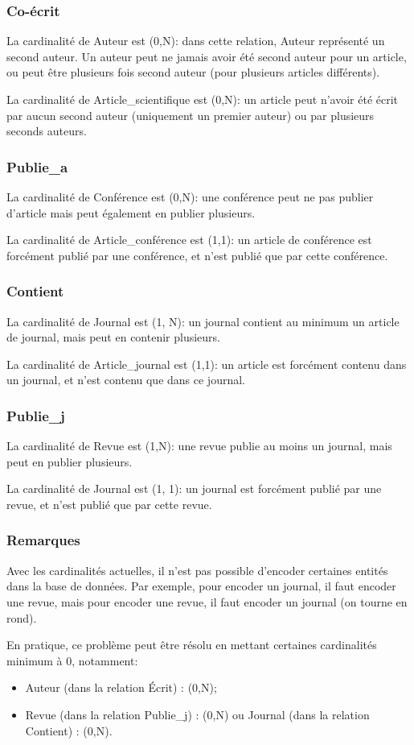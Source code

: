\documentclass[a4paper, 12pt]{article}
\begin{document}
	\subsubsection{Co-écrit}
	La cardinalité de Auteur est (0,N): dans cette relation, Auteur représenté un second auteur. Un auteur peut ne jamais avoir été second auteur pour un article, ou peut être plusieurs fois second auteur (pour plusieurs articles différents).\par
	La cardinalité de Article\_scientifique est (0,N): un article peut n'avoir été écrit par aucun second auteur (uniquement un premier auteur) ou par plusieurs seconds auteurs.
	\subsubsection{Publie\_a}
	La cardinalité de Conférence est (0,N): une conférence peut ne pas publier d'article mais peut également en publier plusieurs.\par
	La cardinalité de Article\_conférence est (1,1): un article de conférence est forcément publié par une conférence, et n'est publié que par cette conférence.
	\subsubsection{Contient}
	La cardinalité de Journal est (1, N): un journal contient au minimum un article de journal, mais peut en contenir plusieurs.\par
	La cardinalité de Article\_journal est (1,1): un article est forcément contenu dans un journal, et n'est contenu que dans ce journal.
	\subsubsection{Publie\_j}
	La cardinalité de Revue est (1,N): une revue publie au moins un journal, mais peut en publier plusieurs.\par
	La cardinalité de Journal est (1, 1): un journal est forcément publié par une revue, et n'est publié que par cette revue.
	\subsubsection{Remarques}
	Avec les cardinalités actuelles, il n'est pas possible d'encoder certaines entités dans la base de données. Par exemple, pour encoder un journal, il faut encoder une revue, mais pour encoder une revue, il faut encoder un journal (on tourne en rond).\par
	En pratique, ce problème peut être résolu en mettant certaines cardinalités minimum à 0, notamment:
	\begin{itemize}
		\item Auteur (dans la relation Écrit) : (0,N);
		\item Revue (dans la relation Publie\_j) : (0,N) ou Journal (dans la relation Contient) : (0,N).
	\end{itemize}
\end{document}
